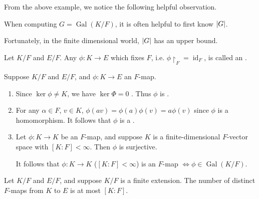 \documentclass[notoc,notitlepage]{tufte-book}
\DeclareMathOperator{\Gal}{Gal}
\DeclareMathOperator{\id}{id}
\begin{document}
From the above example, we notice the following helpful observation.

\begin{remark}
  When computing $G = \Gal(K / F)$, it is often helpful to first know $\left|G\right|$.
\end{remark}

Fortunately, in the finite dimensional world, $\left|G\right|$ has an upper bound.

\begin{defn}[$F$-map]\label{defn:_f_map}
  Let $K / F$ and $E / F$. Any  $\phi : K \to E$ which
  fixes $F$, i.e. $\phi \restriction_F = \id_F$, is called an
  .
\end{defn}

\begin{remark}
  Suppose $K / F$ and $E / F$, and $\phi : K \to E$ an $F$-map.
  \begin{enumerate}
    \item Since $\ker \phi \neq K$, we have $\ker \Phi = 0$ . Thus $\phi$ is
      .
    \item For any $\alpha \in F$, $v \in K$, $\phi(av) = \phi(a) \phi(v) = a
      \phi(v)$ since $\phi$ is a homomorphism. It follows that $\phi$ is a
      .
    \item Let $\phi : K \to K$ be an $F$-map, and suppose $K$ is a
      finite-dimensional $F$-vector space with $[ K : F ] < \infty$. Then $\phi
      $ is surjective.

      It follows that $\phi : K \to K$ ($[K : F] < \infty$) is an $F$-map $\iff
      \phi \in \Gal(K / F)$.
  \end{enumerate}
\end{remark}

\begin{lemma}\label{lemma:number_of_distinct_f_maps}
  Let $K / F$ and $E / F$, and suppose $K / F$ is a finite extension. The number
  of distinct $F$-maps from $K$ to $E$ is at most $[K : F]$.
\end{lemma}
\end{document}
